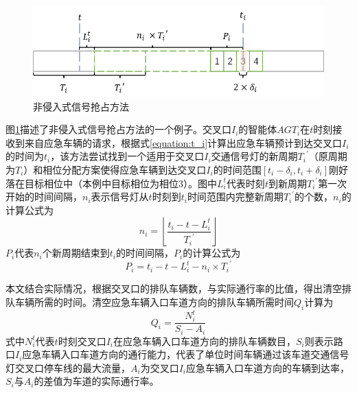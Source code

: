 \begin{figure}[ht]
	\centering
	\includegraphics[width=\textwidth]{figures/non-invasive.png}
	\caption{非侵入式信号抢占方法}
	\label{fig:non-invasive}
\end{figure}

图\ref{fig:non-invasive}描述了非侵入式信号抢占方法的一个例子。交叉口${I_i}$的智能体${AGT_i}$在${t}$时刻接收到来自应急车辆的请求，根据式\ref{equation:t_i}计算出应急车辆预计到达交叉口${I_i}$的时间为${t_i}$，该方法尝试找到一个适用于交叉口${I_i}$交通信号灯的新周期${{T_i}^\prime}$（原周期为${T_i}$）和相位分配方案使得应急车辆到达交叉口${I_i}$的时间范围${[t_i-\delta_i, t_i+\delta_i]}$刚好落在目标相位中（本例中目标相位为相位3）。图中${L_i^t}$代表时刻${t}$到新周期${{T_i}^\prime}$第一次开始的时间间隔，${n_i}$表示信号灯从${t}$时刻到${t_i}$时间范围内完整新周期${{T_i}^\prime}$的个数，${n_i}$的计算公式为
\begin{equation}
	\label{equation:ni}
	n_i=\left\lfloor\frac{t_i-t-L_i^t}{{T_i}^\prime}\right\rfloor
\end{equation}
${P_i}$代表${n_i}$个新周期结束到${t_i}$的时间间隔，${P_i}$的计算公式为
\begin{equation}
	\label{equation:pi}
	P_i=t_i-t-L_i^t-n_i\times{{T_i}^\prime}
\end{equation}

本文结合实际情况，根据交叉口的排队车辆数，与实际通行率的比值，得出清空排队车辆所需的时间。清空应急车辆入口车道方向的排队车辆所需时间${Q_i}$计算为
\begin{equation}
	\label{equation:qi}
	Q_i=\frac{N_i^t}{S_i-A_i}
\end{equation}
式中${N_i^t}$代表${t}$时刻交叉口${I_i}$在应急车辆入口车道方向的排队车辆数目，${S_i}$则表示路口${I_i}$应急车辆入口车道方向的通行能力，代表了单位时间车辆通过该车道交通信号灯交叉口停车线的最大流量，${A_i}$为交叉口${I_i}$应急车辆入口车道方向的车辆到达率，${S_i}$与${A_i}$的差值为车道的实际通行率。

